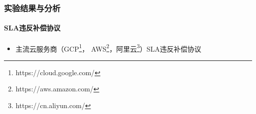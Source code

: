 \begin{frame}
\frametitle{实验结果与分析}
\framesubtitle{SLA违反补偿协议}
\begin{itemize}
    \item 主流云服务商（GCP\footnote{\tiny{https://cloud.google.com/}}，
    AWS\footnote{\tiny{https://aws.amazon.com/}}，阿里云\footnote{\tiny{https://cn.aliyun.com/}}）SLA违反补偿协议
\end{itemize}
\begin{table}[hftb]
        \centering
        \caption{主流云供应商SLA违反补偿金计算}
        \label{tab:tab6}
    \end{table}
\end{frame}